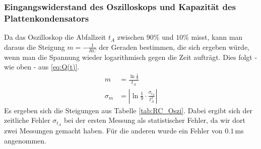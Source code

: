 \documentclass[12pt,a4paper,titlepage,headinclude,bibtotoc]{scrartcl}
\begin{document}
\subsubsection{Eingangswiderstand des Oszilloskops und Kapazität des Plattenkondensators}
Da das Oszilloskop die Abfallzeit $t_A$ zwischen $90\%$ und $10\%$ misst, kann man daraus die Steigung $m=-\frac{1}{RC}$ der Geraden bestimmen, die sich ergeben würde, wenn man die Spannung wieder logarithmisch gegen die Zeit aufträgt. Dies folgt - wie oben - aus \eqref{eq:Q(t)}.
\begin{align*}
	m&=\frac{\ln\frac{1}{9}}{t_A}\\
	\sigma_m&=\left|\ln\frac{1}{9}\cdot \frac{\sigma_{t_A}}{t_A^2}\right|
\end{align*}
Es ergeben sich die Steigungen aus Tabelle \ref{tab:RC_Oszi}.
Dabei ergibt sich der zeitliche Fehler $\sigma_{t_A}$ bei der ersten Messung als statistischer Fehler, da wir dort zwei Messungen gemacht haben.
Für die anderen wurde ein Fehler von $0.1\,$ms angenommen.
\end{document}
